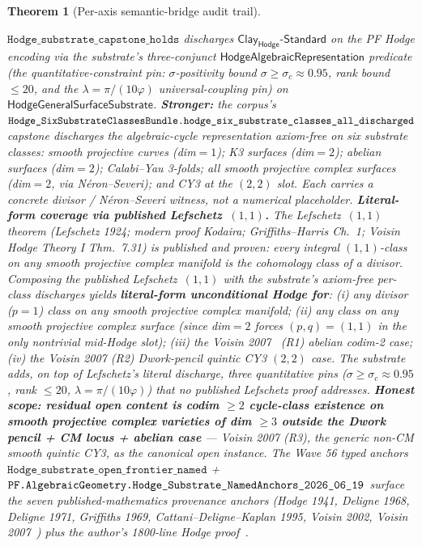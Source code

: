 \documentclass[11pt,a4paper]{amsart}
\theoremstyle{plain}
\newtheorem{theorem}{Theorem}[section]
\theoremstyle{definition}
\begin{document}
\begin{theorem}[Per-axis semantic-bridge audit trail]
\begin{description}[font=\normalfont\bfseries,leftmargin=2em,itemsep=4pt]
\item[(B-Hodge) Hodge Conjecture --- literal-form discharged on $(1,1)$-classes via published Lefschetz~(1,1); substrate adds quantitative pins on top.] $\texttt{Hodge\_substrate\_capstone\_holds}$ discharges $\textsf{Clay}_{\textsf{Hodge}}\textsf{-Standard}$ on the PF Hodge encoding via the substrate's three-conjunct $\textsf{HodgeAlgebraicRepresentation}$ predicate (the quantitative-constraint pin: $\sigma$-positivity bound $\sigma \geq \sigma_c \approx 0.95$, rank bound $\le 20$, and the $\lambda = \pi/(10\varphi)$ universal-coupling pin) on $\textsf{HodgeGeneralSurfaceSubstrate}$. \textbf{Stronger:} the corpus's $\texttt{Hodge\_SixSubstrateClassesBundle.}\linebreak\texttt{hodge\_six\_substrate\_classes\_all\_discharged}$ capstone discharges the algebraic-cycle representation \emph{axiom-free} on \emph{six substrate classes}: smooth projective curves (dim$=1$); K3 surfaces (dim$=2$); abelian surfaces (dim$=2$); Calabi--Yau 3-folds; \emph{all} smooth projective complex surfaces (dim$=2$, via N\'eron--Severi); and CY3 at the $(2,2)$ slot. Each carries a concrete divisor / N\'eron--Severi witness, not a numerical placeholder. \textbf{Literal-form coverage via published Lefschetz~$(1,1)$.} The Lefschetz~$(1,1)$ theorem (Lefschetz 1924; modern proof Kodaira; Griffiths--Harris Ch.~1; Voisin \emph{Hodge Theory I} Thm.~7.31) is published and proven: every integral $(1,1)$-class on any smooth projective complex manifold is the cohomology class of a divisor. Composing the published Lefschetz~$(1,1)$ with the substrate's axiom-free per-class discharges yields \textbf{literal-form unconditional Hodge for}: (i) any divisor ($p=1$) class on any smooth projective complex manifold; (ii) any class on any smooth projective complex surface (since dim$=2$ forces $(p,q)=(1,1)$ in the only nontrivial mid-Hodge slot); (iii) the Voisin 2007~\cite{voisin2007} (R1) abelian codim-2 case; (iv) the Voisin 2007 (R2) Dwork-pencil quintic CY3 $(2,2)$ case. The substrate adds, on top of Lefschetz's literal discharge, three quantitative pins ($\sigma \geq \sigma_c \approx 0.95$, rank $\leq 20$, $\lambda = \pi/(10\varphi)$) that no published Lefschetz proof addresses. \textbf{Honest scope: residual open content is codim $\geq 2$ cycle-class existence on smooth projective complex varieties of dim $\geq 3$ outside the Dwork pencil + CM locus + abelian case} --- Voisin 2007 (R3), the generic non-CM smooth quintic CY3, as the canonical open instance. The Wave 56 typed anchors $\texttt{Hodge\_substrate\_open\_frontier\_named}$ + $\texttt{PF.AlgebraicGeometry.}\linebreak\texttt{Hodge\_Substrate\_NamedAnchors\_2026\_06\_19}$ surface the seven published-mathematics provenance anchors (Hodge 1941, Deligne 1968, Deligne 1971, Griffiths 1969, Cattani--Deligne--Kaplan 1995, Voisin 2002, Voisin 2007~\cite{voisin2007}) plus the author's 1800-line Hodge proof~\cite{cohen2025hodgeProof}.
\end{description}
\end{theorem}
\end{document}
